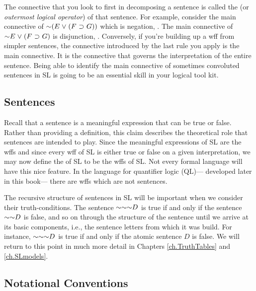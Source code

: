 The connective that you look to first in decomposing a sentence is called the  (or \emph{outermost logical operator}) of that sentence.
For example, consider the main connective of $\enot (E \eor (F \eif G))$ which is negation, \enot.
The main connective of $\enot E \eor (F \eif G)$ is disjunction, \eor.
Conversely, if you're building up a wff from simpler sentences, the connective introduced by the last rule you apply is the main connective.
It is the connective that governs the interpretation of the entire sentence.
Being able to identify the main connective of sometimes convoluted sentences in SL is going to be an essential skill in your logical tool kit.





\subsection{Sentences}

Recall that a sentence is a meaningful expression that can be true or false.
Rather than providing a definition, this claim describes the theoretical role that sentences are intended to play.
Since the meaningful expressions of SL are the wffs and since every wff of SL is either true or false on a given interpretation, we may now define the  of SL to be the wffs of SL.
Not every formal language will have this nice feature.
In the language for quantifier logic (QL)--- developed later in this book--- there are wffs which are not sentences.

The recursive structure of sentences in SL will be important when we consider their truth-conditions.
The sentence $\enot \enot \enot D$ is true if and only if the sentence $\enot \enot D$ is false, and so on through the structure of the sentence until we arrive at its basic components, i.e., the sentence letters from which it was build.
For instance, $\enot \enot \enot D$ is true if and only if the atomic sentence $D$ is false.
We will return to this point in much more detail in Chapters \ref{ch.TruthTables} and \ref{ch.SLmodels}.






\subsection{Notational Conventions}
\label{SLconventions}

